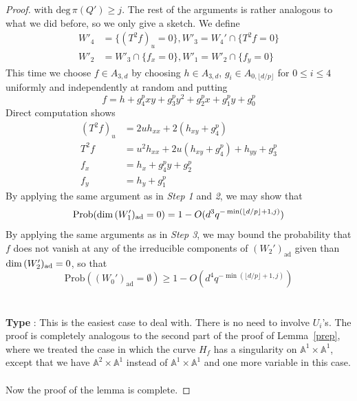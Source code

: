 \documentclass[12pt]{article}
\theoremstyle{plain}
\theoremstyle{definition}
\newcommand{\IA}{\mathbb{A}}
\renewcommand{\deg}{\mathrm{deg}\,}
\renewcommand\dim{{\rm dim\,}}
\newcommand{\<}{\langle}
\renewcommand{\>}{\rangle}
\newcommand{\Prob}{\mathrm{Prob}}
\newcommand{\ad}{\mathrm{ad}}
\newcommand{\yk}{\lfloor d/p \rfloor}
\begin{document}
\begin{proof}
with $\deg \pi(Q') \ge j$. 
The rest of the arguments is rather analogous to what we did before, so we only give a sketch. We define 
\begin{align*}
W'_4 &= \{ (T^2 f)_u = 0 \}, W'_3 = W_4' \cap \{ T^2 f = 0 \} \\
W'_2 &= W'_3 \cap \{ f_x = 0 \}, W'_1 = W'_2 \cap \{ f_y = 0 \}
\end{align*}
This time we choose $f \in A_{3, d}$ by choosing $h \in A_{3, d}$, $g_i \in A_{0, \yk}$ for $0 \le i \le 4$ uniformly and independently at random and putting 
$$ f = h + g_4^p xy + g_3^p y^2 + g_2^p x + g_1^p y + g_0^p $$
Direct computation shows 
\begin{align*}
(T^2 f )_u &= 2u h_{xx} + 2(h_{xy} + g_4^p) \\
T^2 f &= u^2 h_{xx} + 2 u (h_{xy} + g_4^p) + h_{yy} + g_3^p \\
f_x &= h_x + g_4^p y + g_2^p \\
f_y &= h_y + g_1^p 
\end{align*}
By applying the same argument as in \textit{Step 1} and \textit{2}, we may show that 
$$ \Prob(\dim(W'_1)_\ad = 0) = 1 - O(d^3 q^{- \min(\yk + 1, j)}) $$
By applying the same arguments as in \textit{Step 3}, we may bound the probability that $f$ does not vanish at any of the irreducible components of $(W_2')_\ad$ given than $\dim (W'_2)_\ad = 0$, so that 
$$ \Prob((W_0')_\ad = \emptyset) \ge 1 - O(d^4 q^{- \min(\yk + 1, j)}) $$\\\\
\textbf{Type \uppercase\expandafter{}}: This is the easiest case to deal with. There is no need to involve $U_i$'s. The proof is completely analogous to the second part of the proof of Lemma~\ref{prep}, where we treated the case in which the curve $H_f$ has a singularity on $\IA^1 \times \IA^1$, except that we have $\IA^2 \times \IA^1$ instead of $\IA^1 \times \IA^1$ and one more variable in this case. \\\\ 
Now the proof of the lemma is complete. 
\end{proof}
\end{document}
